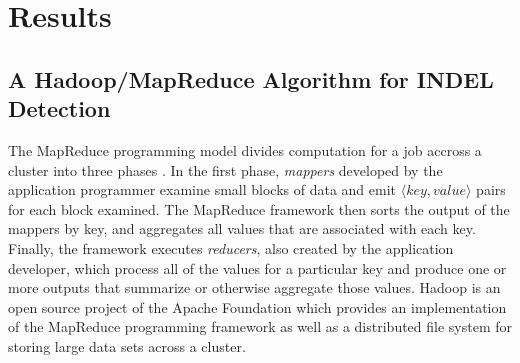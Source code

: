 \documentclass[12pt]{article}
\begin{document}
\section{Results}\label{Results}

\subsection{A Hadoop/MapReduce Algorithm for INDEL Detection}

The MapReduce programming model divides computation for a job accross a cluster into three phases \cite{Dean:2008p277}. In the first phase, \emph{mappers} developed by the application programmer examine small blocks of data and emit $\langle key, value \rangle$ pairs for each block examined. The MapReduce framework then sorts the output of the mappers by key, and aggregates all values that are associated with each key. Finally, the framework executes \emph{reducers}, also created by the application developer, which process all of the values for a particular key and produce one or more outputs that summarize or otherwise aggregate those values. Hadoop is an open source project of the Apache Foundation which provides an implementation of the MapReduce programming framework as well as a distributed file system for storing large data sets across a cluster.
\end{document}
